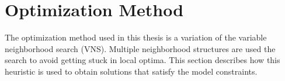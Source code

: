 
\newpage
\section{Optimization Method }
\label{chap:Optimization}


%

%
%
%

The optimization method used in this thesis is a variation of the variable neighborhood search (VNS).
Multiple neighborhood structures are used the search to avoid getting stuck in local optima.
This section describes how this heuristic is used to obtain solutions that satisfy the model constraints. \\



